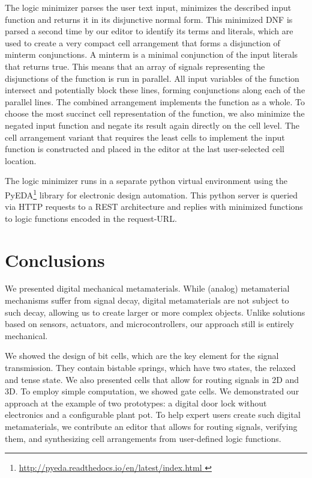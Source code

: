 The logic minimizer parses the user text input, minimizes the described input function and returns it in its disjunctive normal form. This minimized DNF is parsed a second time by our editor to identify its terms and literals, which are used to create a very compact cell arrangement that forms a disjunction of minterm conjunctions. A minterm is a minimal conjunction of the input literals that returns true. This means that an array of signals representing the disjunctions of the function is run in parallel. All input variables of the function intersect and potentially block these lines, forming conjunctions along each of the parallel lines. The combined arrangement implements the function as a whole. To choose the most succinct cell representation of the function, we also minimize the negated input function and negate its result again directly on the cell level. The cell arrangement variant that requires the least cells to implement the input function is constructed and placed in the editor at the last user-selected cell location.

The logic minimizer runs in a separate python virtual environment using the PyEDA\footnote{\url{http://pyeda.readthedocs.io/en/latest/index.html }} library for electronic design automation. This python server is queried via HTTP requests to a REST architecture and replies with minimized functions to logic functions encoded in the request-URL.




\section{Conclusions}

We presented digital mechanical metamaterials. While (analog) metamaterial mechanisms suffer from signal decay, digital metamaterials are not subject to such decay, allowing us to create larger or more complex objects. Unlike solutions based on sensors, actuators, and microcontrollers, our approach still is entirely mechanical. 

We showed the design of bit cells, which are the key element for the signal transmission. They contain bistable springs, which have two states, the relaxed and tense state. We also presented cells that allow for routing signals in 2D and 3D. To employ simple computation, we showed gate cells. We demonstrated our approach at the example of two prototypes: a digital door lock without electronics and a configurable plant pot. To help expert users create such digital metamaterials, we contribute an editor that allows for routing signals, verifying them, and synthesizing cell arrangements from user-defined logic functions.

